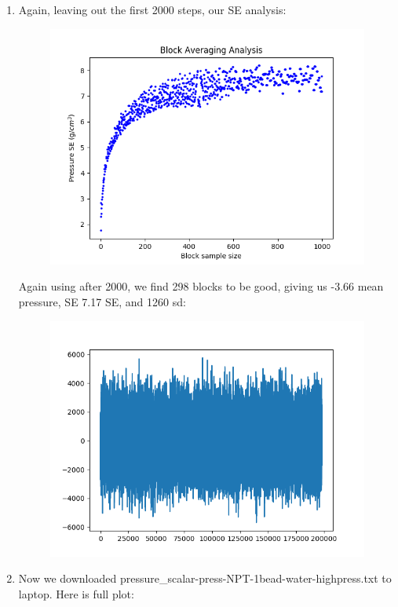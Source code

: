 \documentclass[12pt,reqno]{amsart}
\numberwithin{equation}{section}
\begin{document}
\begin{enumerate}
\item Again, leaving out the first 2000 steps, our SE analysis:
\begin{figure}[H]
\centering
\includegraphics[scale=0.6]{pressure_block_averaging_press-NPT-1bead-water}
\end{figure} 
Again using after 2000, we find 298 blocks to be good, giving us -3.66 mean pressure, SE 7.17 SE, and 1260 sd:
\begin{figure}[H]
\centering
\includegraphics[scale=0.6]{pressures_press-NPT-1bead-water-shortened}
\end{figure} 
\item Now we downloaded pressure\_scalar-press-NPT-1bead-water-highpress.txt to laptop.  Here is full plot:

\end{enumerate}
\end{document}
